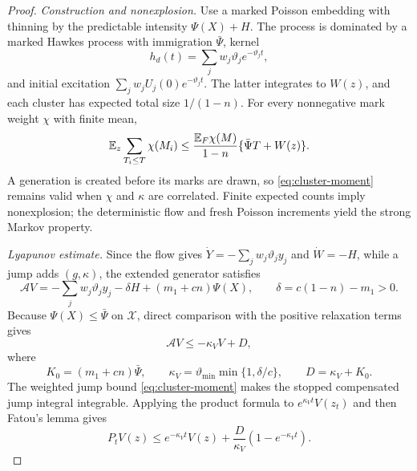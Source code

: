 \begin{proof}
\emph{Construction and nonexplosion.} Use a marked Poisson embedding with thinning by the predictable intensity \(\Psi(X)+H\). The process is dominated by a marked Hawkes process with immigration \(\bar\Psi\), kernel
\[
h_d(t)=\sum_jw_j\vartheta_je^{-\vartheta_jt},
\]
and initial excitation \(\sum_jw_jU_j(0)e^{-\vartheta_jt}\). The latter integrates to \(W(z)\), and each cluster has expected total size \(1/(1-n)\). For every nonnegative mark weight \(\chi\) with finite mean,
\begin{equation}\label{eq:cluster-moment}
\mathbb{E} _z\sum_{T_i\leq T}\chi(M_i)
\leq\frac{\mathbb{E} _F\chi(M)}{1-n}
\{\bar\Psi T+W(z)\}.
\end{equation}
A generation is created before its marks are drawn, so \eqref{eq:cluster-moment} remains valid when \(\chi\) and \(\kappa\) are correlated. Finite expected counts imply nonexplosion; the deterministic flow and fresh Poisson increments yield the strong Markov property.

\emph{Lyapunov estimate.} Since the flow gives \(\dot Y=-\sum_jw_j\vartheta_jy_j\) and \(\dot W=-H\), while a jump adds \((g,\kappa)\), the extended generator satisfies
\[
\mathcal AV
=-\sum_jw_j\vartheta_jy_j-\delta H+(m_1+cn)\Psi(X),
\qquad
\delta=c(1-n)-m_1>0.
\]
Because \(\Psi(X)\leq\bar\Psi\) on \(\mathcal X\), direct comparison with the positive relaxation terms gives
\begin{equation}\label{eq:generator-bound}
\mathcal AV\leq-\kappa_V V+D,
\end{equation}
where
\[
K_0=(m_1+cn)\bar\Psi,\qquad
\kappa_V=\vartheta_{\min}\min\{1,\delta/c\},\qquad
D=\kappa_V+K_0.
\]
The weighted jump bound \eqref{eq:cluster-moment} makes the stopped compensated jump integral integrable. Applying the product formula to \(e^{\kappa_V t}V(z_t)\) and then Fatou's lemma gives
\begin{equation}\label{eq:lyap-moment}
P_tV(z)\leq e^{-\kappa_V t}V(z)+\frac{D}{\kappa_V}(1-e^{-\kappa_V t}).
\end{equation}


\end{proof}
